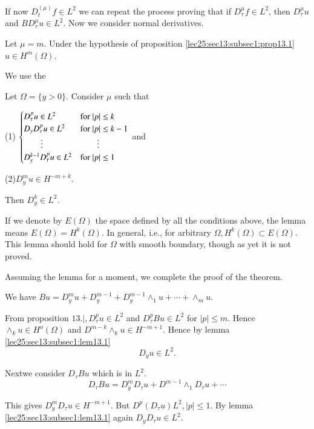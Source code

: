 If now $D^{(\mu)}_{t} f \in L^2$ we can repeat the process
proving that if $D^{\mu}_{\tau} f \in L^2$, then
$D^{\mu}_{\tau} u$ and $B D^{\mu}_{\tau} u \in L^2$. Now we
consider normal derivatives. 

\begin{theorem}\label{lec25:sec13:subsec1:thm13.1}%
  Let $\mu= m$. Under the hypothesis of proposition \ref{lec25:sec13:subsec1:prop13.1} $u \in
  H^m (\Omega)$. 
\end{theorem}

We use the
\begin{lemma}\label{lec25:sec13:subsec1:lem13.1}%
Let $\Omega = \{y > 0\}$. Consider $\mu$ such that

\medskip
(1) \quad 
$\begin{cases}
  D^p_\tau u \in L^2 & {\rm for }~ | p | \le k\\
  D_y D^p_\tau u \in L^2 & {\rm for }~ | p | \le k -1\\
  \qquad \vdots & \qquad \vdots\\
  D^{k-1}_y D^p_\tau u \in L^2 & {\rm for }~  | p | \leq 1 
\end{cases}$ \qquad  and 

(2)\quad $D^m_y u \in H^{-m + k}$.
\end{lemma}

Then $D^k_y \in L^2$.

If we denote by $E(\Omega)$ the space defined by all the conditions
above, the lemma means $E(\Omega) = H^k (\Omega)$. In general, i.e., for
arbitrary $\Omega, H^k (\Omega) \subset E (\Omega)$. This lemma should
hold for $\Omega$ with smooth boundary, though as yet it is not
proved. 

Assuming the lemma for a moment, we complete the proof of the theorem.

We have $Bu = D^m_y u + D^{m-1}_y + D^{m-1}_y \wedge_1 u + \cdots + \wedge_m u$.

From proposition $13.|, D^p_\tau u \in L^2$ and $D^{p}_{\tau}
Bu \in L^2$ for $|p| \le m$. Hence $\wedge_k u \in H^o
(\Omega)$ and $D^{m-k} \wedge_k u \in H^{-m+1}$. Hence by
lemma \ref{lec25:sec13:subsec1:lem13.1} 
$$
D_y u \in L^2.
$$

Next\pageoriginale we consider $D_\tau B u$ which is in $L^2$.
$$
D_\tau B u = D^m_y D_\tau u  + D^{m-1} \wedge_1 D_\tau u + \cdots
$$

This gives $D^m_y D_\tau u \in H^{-m + 1}$. But $D^{p}(D_\tau
u) L^2, |p| \le 1$. By lemma \ref{lec25:sec13:subsec1:lem13.1} again $D_y D_\tau u \in
L^2$. 

